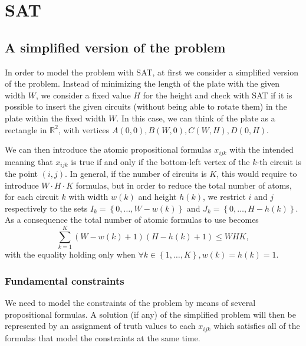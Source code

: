 \documentclass[]{article}
\title{}
\author{}
\begin{document}
\maketitle

\section{SAT}
\subsection{A simplified version of the problem}
In order to model the problem with SAT, at first we consider a simplified version of the problem. Instead of minimizing the length of the plate with the given width $W$, we consider a fixed value $H$ for the height and check with SAT if it is possible to insert the given circuits (without being able to rotate them) in the plate within the fixed width $W$. In this case, we can think of the plate as a rectangle in $\mathbb{R}^2$, with vertices $A(0,0), B(W,0), C(W,H), D(0,H)$.

We can then introduce the atomic propositional formulas $x_{ijk}$ with the intended meaning that $x_{ijk}$ is true if and only if the bottom-left vertex of the $k$-th circuit is the point $(i,j)$.
In general, if the number of circuits is $K$, this would require to introduce $W\cdot H\cdot K$ formulas, but in order to reduce the total number of atoms, for each circuit $k$ with width $w(k)$ and height $h(k)$, we restrict $i$ and $j$ respectively to the sets $I_k=\left\{0, \dots, W-w(k)\right\}$ and $J_k=\left\{0, \dots, H-h(k)\right\}$. As a consequence the total number of atomic formulas to use becomes \begin{equation*}\sum_{k=1}^K \left(W-w(k)+1\right) \left(H-h(k)+1\right) \leq WHK,\end{equation*} with the equality holding only when $\forall k\in \left\{1,\dots,K\right\}, w(k) = h(k) = 1$.

\subsubsection{Fundamental constraints}
We need to model the constraints of the problem by means of several propositional formulas. A solution (if any) of the simplified problem will then be represented by an assignment of truth values to each $x_{ijk}$ which satisfies all of the formulas that model the constraints at the same time. 
\end{document}
